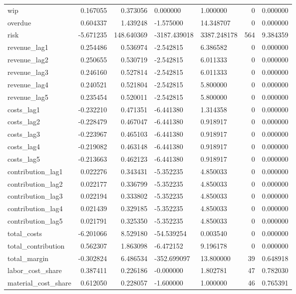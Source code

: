 \begin{landscape}
\begin{longtable}[h!]{lrrllrr}
wip & 0.167055 & 0.373056 & 0.000000 & 1.000000 & 0 & 0.000000 \\
overdue & 0.604337 & 1.439248 & -1.575000 & 14.348707 & 0 & 0.000000 \\
risk & -5.671235 & 148.640369 & -3187.439018 & 3387.248178 & 564 & 9.384359 \\
revenue_lag1 & 0.254486 & 0.536974 & -2.542815 & 6.386582 & 0 & 0.000000 \\
revenue_lag2 & 0.250655 & 0.530719 & -2.542815 & 6.011333 & 0 & 0.000000 \\
revenue_lag3 & 0.246160 & 0.527814 & -2.542815 & 6.011333 & 0 & 0.000000 \\
revenue_lag4 & 0.240521 & 0.521804 & -2.542815 & 5.800000 & 0 & 0.000000 \\
revenue_lag5 & 0.235454 & 0.520011 & -2.542815 & 5.800000 & 0 & 0.000000 \\
costs_lag1 & -0.232210 & 0.471351 & -6.441380 & 1.314358 & 0 & 0.000000 \\
costs_lag2 & -0.228479 & 0.467047 & -6.441380 & 0.918917 & 0 & 0.000000 \\
costs_lag3 & -0.223967 & 0.465103 & -6.441380 & 0.918917 & 0 & 0.000000 \\
costs_lag4 & -0.219082 & 0.463148 & -6.441380 & 0.918917 & 0 & 0.000000 \\
costs_lag5 & -0.213663 & 0.462123 & -6.441380 & 0.918917 & 0 & 0.000000 \\
contribution_lag1 & 0.022276 & 0.343431 & -5.352235 & 4.850033 & 0 & 0.000000 \\
contribution_lag2 & 0.022177 & 0.336799 & -5.352235 & 4.850033 & 0 & 0.000000 \\
contribution_lag3 & 0.022194 & 0.333802 & -5.352235 & 4.850033 & 0 & 0.000000 \\
contribution_lag4 & 0.021439 & 0.329185 & -5.352235 & 4.850033 & 0 & 0.000000 \\
contribution_lag5 & 0.021791 & 0.325350 & -5.352235 & 4.850033 & 0 & 0.000000 \\
total_costs & -6.201066 & 8.529180 & -54.539254 & 0.003540 & 0 & 0.000000 \\
total_contribution & 0.562307 & 1.863098 & -6.472152 & 9.196178 & 0 & 0.000000 \\
total_margin & -0.302824 & 6.486534 & -352.699097 & 13.800000 & 39 & 0.648918 \\
labor_cost_share & 0.387411 & 0.226186 & -0.000000 & 1.802781 & 47 & 0.782030 \\
material_cost_share & 0.612050 & 0.228057 & -1.600000 & 1.000000 & 46 & 0.765391 \\

\end{longtable}
\end{landscape}
